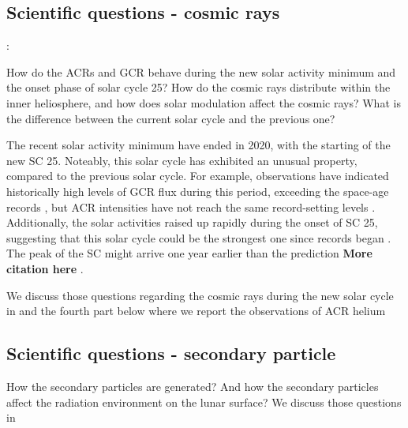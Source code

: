 
\subsection*{Scientific questions - cosmic rays}:

How do the \acp{ACR} and \ac{GCR} behave during the new solar activity minimum and the onset phase of solar cycle 25? How do the cosmic rays distribute within the inner heliosphere, and how does solar modulation affect the cosmic rays? What is the difference between the current solar cycle and the previous one? 

The recent solar activity minimum have ended in 2020, with the starting of the new \ac{SC} 25. Noteably, this solar cycle has exhibited an unusual property, compared to the previous solar cycle. For example, observations have indicated historically high levels of \ac{GCR} flux during this period, exceeding the space-age records \citep{Fu2021ApJS, Xu2022FrASS}, but \ac{ACR} intensities have not reach the same record-setting levels \citet{Strauss2023ApJ}. 
Additionally, the solar activities raised up rapidly during the onset of \ac{SC} 25, suggesting that this solar cycle could be the strongest one since records began \citep{Nagovitsyn2023SoPh}. The peak of the \ac{SC} might arrive one year earlier than the prediction \textbf{More citation here} \citep{McIntosh2020SoPh}.

We discuss those questions regarding the cosmic rays during the new solar cycle in \citet{Xu2022FrASS,Mason-2021-SolOQuietTime} and the fourth part below where we report the observations of \ac{ACR} helium

\subsection*{Scientific questions - secondary particle}
How the secondary particles are generated? And how the secondary particles affect the radiation environment on the lunar surface? We discuss those questions in \citet{Xu2022FrASS}


